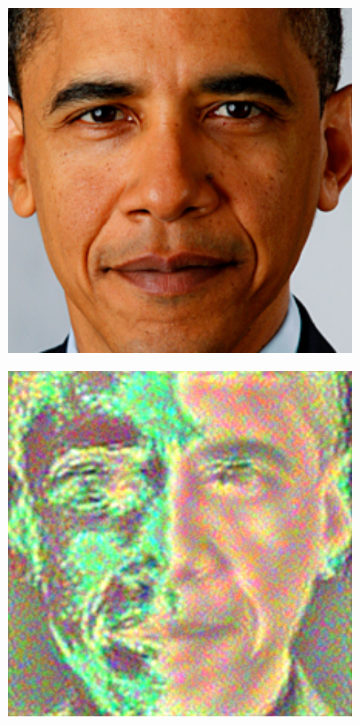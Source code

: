 \documentclass[10pt,twocolumn,letterpaper]{article}
\begin{document}
\begin{figure}[h!]
    \centering
    \begin{subfigure}[b]{0.24\linewidth}
        \includegraphics[width=\linewidth]{images/outputs/barack_target.png}
    \end{subfigure}
    \begin{subfigure}[b]{0.24\linewidth}
        \includegraphics[width=\linewidth]{images/outputs/barack_output.png}

\end{subfigure}
\end{figure}
\end{document}
